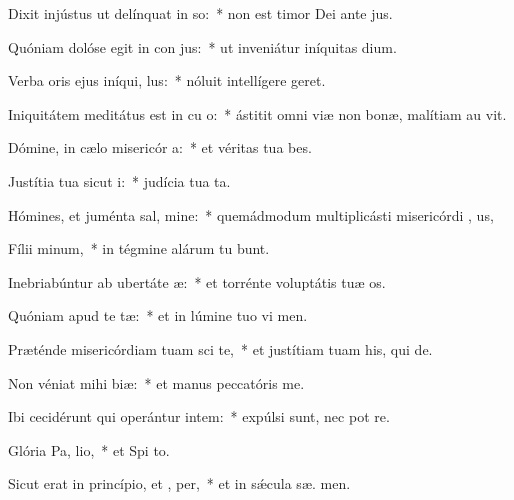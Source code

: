 \item Dixit injústus ut delínquat in so:~* non est timor Dei ante  jus.
\item Quóniam dolóse egit in con jus:~* ut inveniátur iníquitas   dium.
\item Verba oris ejus iníqui,  lus:~* nóluit intellígere   geret.
\item Iniquitátem meditátus est in cu o:~* ástitit omni viæ non bonæ, malítiam au  vit.
\item Dómine, in cælo misericór a:~* et véritas tua   bes.
\item Justítia tua sicut  i:~* judícia tua  ta.
\item Hómines, et juménta sal, mine:~* quemádmodum multiplicásti misericórdi , us,
\item Fílii  minum,~* in tégmine alárum tu bunt.
\item Inebriabúntur ab ubertáte  æ:~* et torrénte voluptátis tuæ  os.
\item Quóniam apud te   tæ:~* et in lúmine tuo vi men.
\item Præténde misericórdiam tuam sci te,~* et justítiam tuam his, qui   de.
\item Non véniat mihi  biæ:~* et manus peccatóris   me.
\item Ibi cecidérunt qui operántur intem:~* expúlsi sunt, nec pot re.
\item Glória Pa,  lio,~* et Spi to.
\item Sicut erat in princípio, et ,  per,~* et in sǽcula sæ. men.
